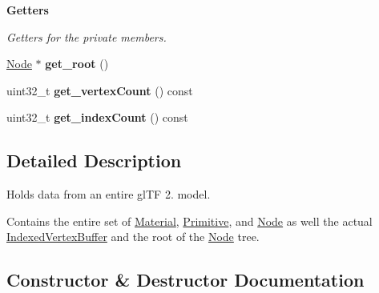 \begin{Indent}\textbf{ Getters}\par
{\em Getters for the private members. }\begin{DoxyCompactItemize}
\item 
\mbox{\label{classblaze_1_1Model_a46b15cb47420afca97d4b2b2cadb5755}} 
\hyperlink{structblaze_1_1Node}{Node} $\ast$ {\bfseries get\+\_\+root} ()
\item 
\mbox{\label{classblaze_1_1Model_a23100a15963328a52e55d5ff860316c1}} 
uint32\+\_\+t {\bfseries get\+\_\+vertex\+Count} () const
\item 
\mbox{\label{classblaze_1_1Model_a1db46cfbc8cedf9e84a2ba8bd1a6ebe5}} 
uint32\+\_\+t {\bfseries get\+\_\+index\+Count} () const
\end{DoxyCompactItemize}
\end{Indent}


\subsection{Detailed Description}
Holds data from an entire gl\+TF 2. model. 

Contains the entire set of \hyperlink{classblaze_1_1Material}{Material}, \hyperlink{structblaze_1_1Primitive}{Primitive}, and \hyperlink{structblaze_1_1Node}{Node} as well the actual \hyperlink{classblaze_1_1IndexedVertexBuffer}{Indexed\+Vertex\+Buffer} and the root of the \hyperlink{structblaze_1_1Node}{Node} tree. 

\subsection{Constructor \& Destructor Documentation}
\mbox{\label{classblaze_1_1Model_a99429577ddc36a20a801f412f12d8b97}} 
